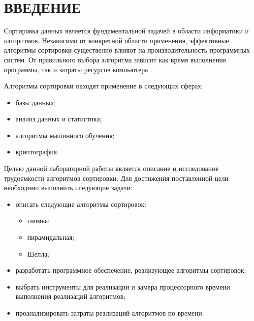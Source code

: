 \chapter*{ВВЕДЕНИЕ}

Сортировка данных является фундаментальной задачей в области информатики и алгоритмов. 
Независимо от конкретной области применения, эффективные алгоритмы сортировки существенно влияют на производительность программных систем. 
От правильного выбора алгоритма зависит как время выполнения программы, так и затраты ресурсов компьютера \cite{knut}.

Алгоритмы сортировки находят применение в следующих сферах:
\begin{itemize}
	\item базы данных;
	\item анализ данных и статистика;
	\item алгоритмы машинного обучения;
	\item криптография.
\end{itemize}

Целью данной лабораторной работы является описание и исследование трудоемкости алгоритмов сортировки.
Для достижения поставленной цели необходимо выполнить следующие задачи:

\begin{itemize}
	\item описать следующие алгоритмы сортировок: 
	\begin{itemize}
		\item гномья;
		\item пирамидальная;
		\item Шелла;
	\end{itemize}
	\item разработать программное обеспечение, реализующее алгоритмы сортировок;
	\item выбрать инструменты для реализации и замера процессорного времени
	выполнения реализаций алгоритмов;
	\item проанализировать затраты реализаций алгоритмов по времени.
\end{itemize}
